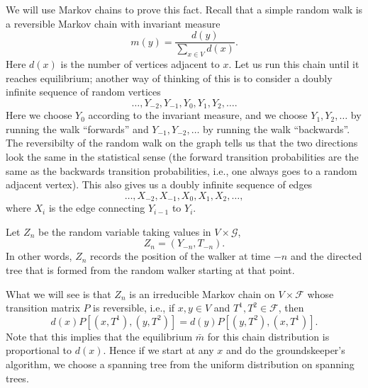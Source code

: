 \documentclass{stml-l}
\theoremstyle{definition}
\numberwithin{equation}{chapter}
\numberwithin{figure}{chapter}
\numberwithin{figure}{section}
\begin{document}
We will use Markov chains to prove this fact. Recall that a simple
random walk is a reversible Markov chain with invariant measure
\begin{equation*}
m(y)=\frac{d(y)}{\sum_{x\in V}d(x)}.
\end{equation*}
Here $d(x)$ is the number of vertices adjacent to $x$. Let us run
this chain until it reaches equilibrium; another way of thinking of
this is to consider a doubly infinite sequence of random vertices
\begin{equation*}
\ldots,Y_{-2},Y_{-1},Y_{0},Y_{1},Y_{2},\ldots.
\end{equation*}
Here we choose $Y_{0}$ according to the invariant measure, and we
choose $Y_{1},Y_{2},\ldots$ by running the walk ``forwards'' and
$Y_{-1},Y_{-2},\ldots$ by running the walk ``backwards''. The
reversibilty of the random walk on the graph tells us that the two
directions look the same in the statistical sense (the forward
transition probabilities are the same as the backwards transition
probabilities, i.e., one always goes to a random adjacent vertex).
This also gives us a doubly infinite sequence of edges
\begin{equation*}
\ldots,X_{-2},X_{-1},X_{0},X_{1},X_{2},\ldots,
\end{equation*}
where $X_{i}$ is the edge connecting $Y_{i-1}$ to $Y_{i}$.

Let $Z_{n}$ be the random variable taking values in $V\times \mathcal{G}$,
\begin{equation*}
Z_{n}=(Y_{-n},T_{-n}).
\end{equation*}
In other words, $Z_{n}$ records the position of the walker at time
$-n$ and the directed tree that is formed from the random walker
starting at that point.

What we will see is that $Z_{n}$ is an irreducible Markov chain on
$V\times \mathcal{F}$ whose transition matrix $P$ is reversible,
i.e., if $x,y\in V$ and $T^{1},T^{2}\in \mathcal{F}$, then
\begin{equation}
\label{ch10:eqn10.2}d(x)P[(x,T^{1}),(y,T^{2})]=d(y)P[(y,T^{2}),(x,T^{1})].
\end{equation}
Note that this implies that the equilibrium $\bar{m}$ for this chain
distribution is proportional to $d(x)$. Hence if we start at any
$x$ and do the groundskeeper's algorithm, we choose a spanning tree
from the uniform distribution on spanning trees.
\end{document}
